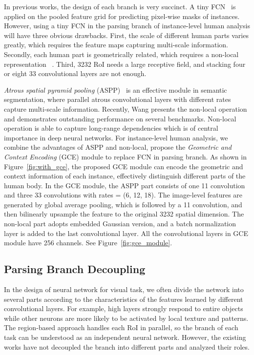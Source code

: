 \documentclass[10pt,twocolumn,letterpaper]{article}
\begin{document}
In previous works, the design of each branch is very succinct. A tiny FCN~\cite{Long_cvpr2015_fcn} is applied on the pooled feature grid for predicting pixel-wise masks of instances. However, using a tiny FCN in the parsing branch of instance-level human analysis will have three obvious drawbacks. First, the scale of different human parts varies greatly, which requires the feature maps capturing multi-scale information. Secondly, each human part is geometrically related, which requires a non-local representation~\cite{Buades_cvpr2005_nonlocal} . Third, 3232 RoI needs a large receptive field, and stacking four or eight 33 convolutional layers are not enough. 

\emph{Atrous spatial pyramid pooling} (ASPP)~\cite{Chen_tpami2016_deeplab, Chen_arxiv2017_deeplabv3, Chen_eccv2018_deeplabv3plus} is an effective module in semantic segmentation, where parallel atrous convolutional layers with different rates capture multi-scale information. Recently, Wang \etal presents the non-local operation and demonstrates outstanding performance on several benchmarks. Non-local~\cite{Wang_cvpr2018_nonlocal} operation is able to capture long-range dependencies which is of central importance in deep neural networks. For instance-level human analysis, we combine the advantages of ASPP and non-local, propose the \emph{Geometric and Context Encoding} (GCE) module to replace FCN in parsing branch. As shown in Figure~\ref{fig:with_gce}, the proposed GCE module can encode the geometric and context information of each instance, effectively distinguish different parts of the human body. In the GCE module, the ASPP part consists of one 11 convolution and three 33 convolutions with rates = (6, 12, 18). The image-level features are generated by global average pooling, which is followed by a 11 convolution, and then bilinearly upsample the feature to the original 3232 spatial dimension. The non-local part adopts embedded Gaussian version, and a batch normalization~\cite{Ioffe_icml2015_bn} layer is added to the last convolutional layer. All the convolutional layers in GCE module have 256 channels. See Figure~\ref{fig:gce_module}.

\subsection{Parsing Branch Decoupling}
In the design of neural network for visual task, we often divide the network into several parts according to the characteristics of the features learned by different convolutional layers. For example, high layers strongly respond to entire objects while other neurons are more likely to be activated by local texture and patterns. The region-based approach handles each RoI in parallel, so the branch of each task can be understood as an independent neural network. However, the existing works have not decoupled the branch into different parts and analyzed their roles.
\end{document}
